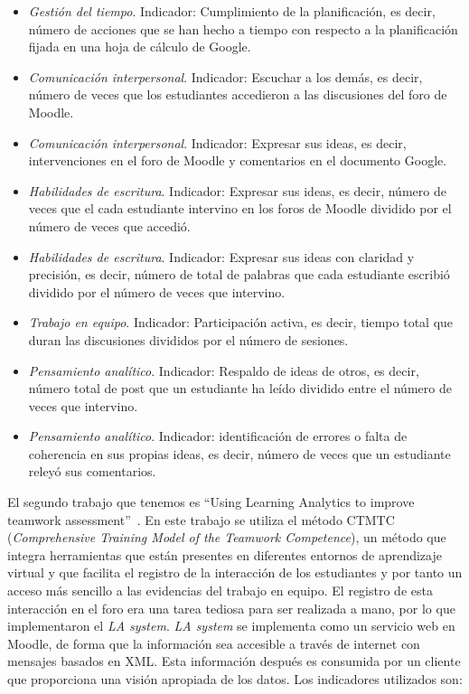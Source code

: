 \begin{itemize}
\item \emph{Gestión del tiempo}. Indicador: Cumplimiento de la planificación, es decir, número de acciones que se han hecho a tiempo con respecto a la planificación fijada en una hoja de cálculo de Google.
\item \emph{Comunicación interpersonal}. Indicador: Escuchar a los demás, es decir, número de veces que los estudiantes accedieron a las discusiones del foro de Moodle.
\item \emph{Comunicación interpersonal}. Indicador: Expresar sus ideas, es decir, intervenciones en el foro de Moodle y comentarios en el documento Google.
\item \emph{Habilidades de escritura}. Indicador: Expresar sus ideas, es decir, número de veces que el cada estudiante intervino en los foros de Moodle dividido por el número de veces que accedió.
\item \emph{Habilidades de escritura}. Indicador: Expresar sus ideas con claridad y precisión, es decir, número de total de palabras que cada estudiante escribió dividido por el número de veces que intervino.
\item \emph{Trabajo en equipo}. Indicador: Participación activa, es decir, tiempo total que duran las discusiones divididos por el número de sesiones.
\item \emph{Pensamiento analítico}. Indicador: Respaldo de ideas de otros, es decir, número total de post que un estudiante ha leído dividido entre el número de veces que intervino.
\item \emph{Pensamiento analítico}. Indicador: identificación de errores o falta de coherencia en sus propias ideas, es decir, número de veces que un estudiante releyó sus comentarios.
\end{itemize}

\bigskip
El segundo trabajo que tenemos es “Using Learning Analytics to improve teamwork assessment”~\cite{fidalgo:2015}. En este trabajo se utiliza el método CTMTC (\emph{Comprehensive Training Model of the Teamwork Competence}), un método que integra herramientas que están presentes en diferentes entornos de aprendizaje virtual y que facilita el registro de la interacción de los estudiantes y por tanto un acceso más sencillo a las evidencias del trabajo en equipo. El registro de esta interacción en el foro era una tarea tediosa para ser realizada a mano, por lo que implementaron el \emph{LA system}. \emph{LA system} se implementa como un servicio web en Moodle, de forma que la información sea accesible a través de internet con mensajes basados en XML. Esta información después es consumida por un cliente que proporciona una visión apropiada de los datos. Los indicadores utilizados son:

